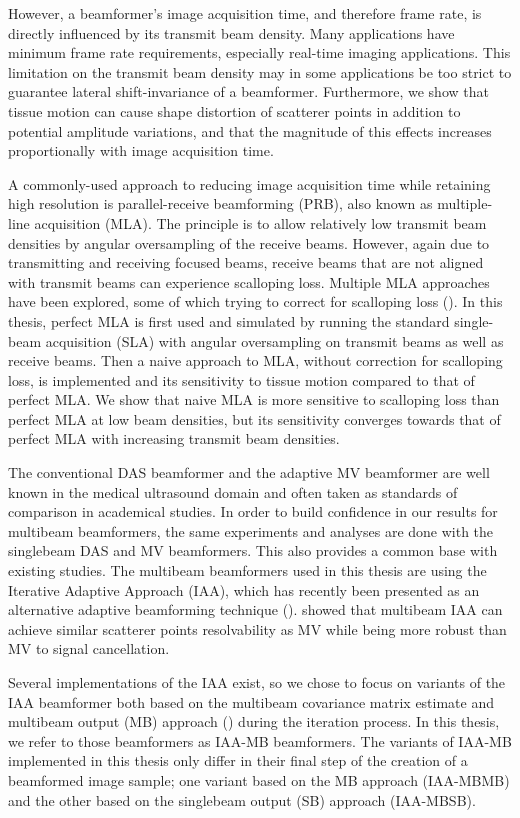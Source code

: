 However, a beamformer's image acquisition time, and therefore frame rate, is directly influenced by its transmit beam density.
Many applications have minimum frame rate requirements, especially real-time imaging applications. This limitation on the transmit beam density may in some applications be too strict to guarantee lateral shift-invariance of a beamformer.
Furthermore, we show that tissue motion can cause shape distortion of scatterer points in addition to potential amplitude variations, and that the magnitude of this effects increases proportionally with image acquisition time.

A commonly-used approach to reducing image acquisition time while retaining high resolution 
is parallel-receive beamforming (PRB), also known as multiple-line acquisition (MLA).
The principle is to allow relatively low transmit beam densities by angular oversampling of the receive beams. However, again due to transmitting and receiving focused beams, receive beams that are not aligned with transmit beams can experience scalloping loss.
Multiple MLA approaches have been explored, some of which trying to correct for scalloping loss (\cite{prb_approaches}).
In this thesis, perfect MLA is first used and simulated by running the standard single-beam acquisition (SLA) with angular oversampling on transmit beams as well as receive beams.
Then a naive approach to MLA, without correction for scalloping loss, is implemented and its sensitivity to tissue motion compared to that of perfect MLA.
We show that naive MLA is more sensitive to scalloping loss than perfect MLA at low beam densities, but its sensitivity converges towards that of perfect MLA with increasing transmit beam densities.

The conventional DAS beamformer and the adaptive MV beamformer are well known in the medical ultrasound domain and often taken as standards of comparison in academical studies.
In order to build confidence in our results for multibeam beamformers, the same experiments and analyses are done with the singlebeam DAS and MV beamformers. This also provides a common base with existing studies.
The multibeam beamformers used in this thesis are using the Iterative Adaptive Approach (IAA), which has recently been presented as an alternative adaptive beamforming technique (\cite{Yardibi}).
\cite{Jensen_IAA} showed that multibeam IAA can achieve similar scatterer points resolvability as MV while being more robust than MV to signal cancellation.

Several implementations of the IAA exist, so we chose to focus on variants of the IAA beamformer both based on the multibeam covariance matrix estimate and multibeam output (MB) approach (\cite{Jensen_IAA}) during the iteration process.
In this thesis, we refer to those beamformers as IAA-MB beamformers.
The variants of IAA-MB implemented in this thesis only differ in their final step of the creation of a beamformed image sample; one variant based on the MB approach (IAA-MBMB) and the other based on the singlebeam output (SB) approach (IAA-MBSB).


